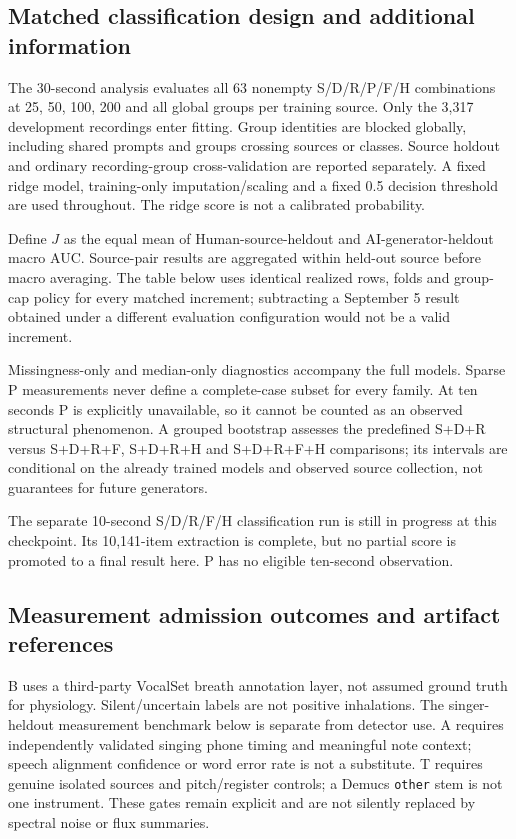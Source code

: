 \subsection{Matched classification design and additional information}

The 30-second analysis evaluates all 63 nonempty S/D/R/P/F/H combinations at
25, 50, 100, 200 and all global groups per training source. Only the 3,317
development recordings enter fitting. Group identities are blocked globally,
including shared prompts and groups crossing sources or classes. Source holdout
and ordinary recording-group cross-validation are reported separately. A fixed
ridge model, training-only imputation/scaling and a fixed 0.5 decision threshold
are used throughout. The ridge score is not a calibrated probability.

Define $J$ as the equal mean of Human-source-heldout and AI-generator-heldout
macro AUC. Source-pair results are aggregated within held-out source before
macro averaging. The table below uses identical realized rows, folds and group-cap
policy for every matched increment; subtracting a September 5 result obtained
under a different evaluation configuration would not be a valid increment.


Missingness-only and median-only diagnostics accompany the full models.
Sparse P measurements never define a complete-case subset for every family.
At ten seconds P is explicitly unavailable, so it cannot be counted as an
observed structural phenomenon. A grouped bootstrap assesses the predefined
S+D+R versus S+D+R+F, S+D+R+H and S+D+R+F+H comparisons; its intervals are
conditional on the already trained models and observed source collection,
not guarantees for future generators.



The separate 10-second S/D/R/F/H classification run is still in progress at
this checkpoint. Its 10,141-item extraction is complete, but no partial score
is promoted to a final result here. P has no eligible ten-second observation.

\subsection{Measurement admission outcomes and artifact references}

B uses a third-party VocalSet breath annotation layer, not assumed ground
truth for physiology. Silent/uncertain labels are not positive inhalations.
The singer-heldout measurement benchmark below is separate from detector use. A
requires independently validated singing phone timing and meaningful note
context; speech alignment confidence or word error rate is not a substitute.
T requires genuine isolated sources and pitch/register controls; a Demucs
\texttt{other} stem is not one instrument. These gates remain explicit and are
not silently replaced by spectral noise or flux summaries.

